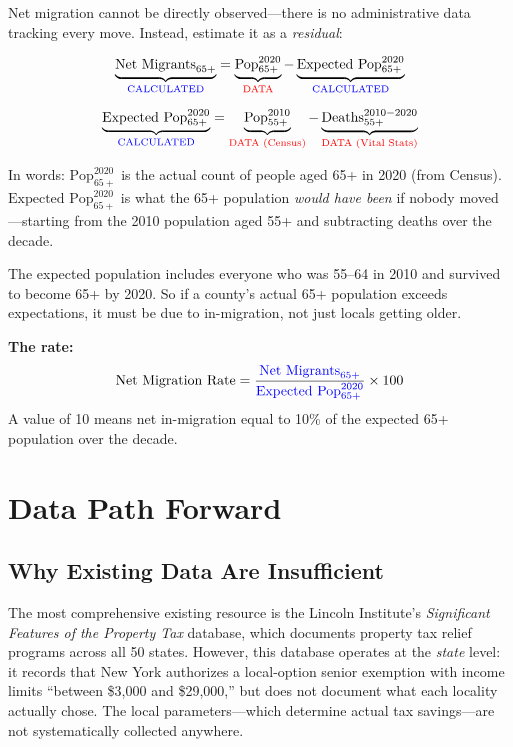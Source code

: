 \documentclass[11pt]{article}
\begin{document}
Net migration cannot be directly observed---there is no administrative data tracking every move. Instead, \citet{EganRobertson2024} estimate it as a \textit{residual}:

\begin{equation}
\underbrace{\text{Net Migrants}_{65+}}_{\textcolor{blue}{\text{CALCULATED}}} = \underbrace{\text{Pop}_{65+}^{2020}}_{\textcolor{red}{\text{DATA}}} - \underbrace{\text{Expected Pop}_{65+}^{2020}}_{\textcolor{blue}{\text{CALCULATED}}}
\end{equation}

\begin{equation}
\underbrace{\text{Expected Pop}_{65+}^{2020}}_{\textcolor{blue}{\text{CALCULATED}}} = \underbrace{\text{Pop}_{55+}^{2010}}_{\textcolor{red}{\text{DATA (Census)}}} - \underbrace{\text{Deaths}_{55+}^{2010-2020}}_{\textcolor{red}{\text{DATA (Vital Stats)}}}
\end{equation}

\noindent In words: $\text{Pop}_{65+}^{2020}$ is the actual count of people aged 65+ in 2020 (from Census). $\text{Expected Pop}_{65+}^{2020}$ is what the 65+ population \textit{would have been} if nobody moved---starting from the 2010 population aged 55+ and subtracting deaths over the decade.

The expected population includes everyone who was 55--64 in 2010 and survived to become 65+ by 2020. So if a county's actual 65+ population exceeds expectations, it must be due to in-migration, not just locals getting older.

\medskip
\noindent\textbf{The rate:}
{\small
\[
\text{Net Migration Rate} = \frac{\textcolor{blue}{\text{Net Migrants}_{65+}}}{\textcolor{blue}{\text{Expected Pop}_{65+}^{2020}}} \times 100
\]}
A value of 10 means net in-migration equal to 10\% of the expected 65+ population over the decade.

\section{Data Path Forward}
\label{app:data_path}

\subsection{Why Existing Data Are Insufficient}

The most comprehensive existing resource is the Lincoln Institute's \textit{Significant Features of the Property Tax} database, which documents property tax relief programs across all 50 states. However, this database operates at the \textit{state} level: it records that New York authorizes a local-option senior exemption with income limits ``between \$3,000 and \$29,000,'' but does not document what each locality actually chose. The local parameters---which determine actual tax savings---are not systematically collected anywhere.
\end{document}
